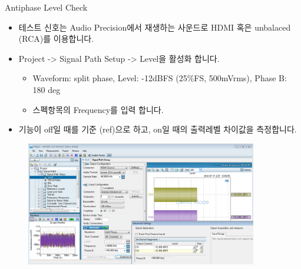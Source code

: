 \documentclass{beamer}
\begin{document}
\begin{frame}[t]{Antiphase Level Check}
\begin{itemize}
\item 테스트 신호는 Audio Precision에서 재생하는 사운드로 HDMI 혹은 unbalaced (RCA)를 이용합니다.
\item Project -> Signal Path Setup -> Level을 활성화 합니다.
	\begin{itemize}
	\item Waveform: split phase, Level: -12dBFS (25\%FS, 500mVrms), Phase B: 180 deg
	\item 스펙항목의 Frequency를 입력 합니다.
	\end{itemize}
\item 기능이 off일 때를 기준 (ref)으로 하고, on일 때의 출력레벨 차이값을 측정합니다.
\end{itemize}

\begin{figure}[b]
\includegraphics[width=0.9\textwidth]{figure/apsetting/antiphaseLevel.png}
\end{figure}

\end{frame}
\end{document}
